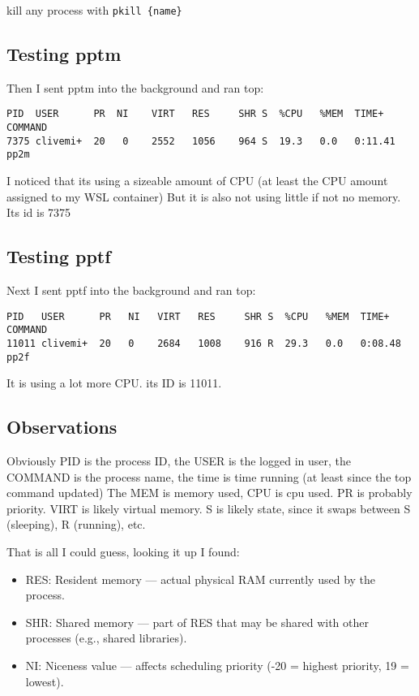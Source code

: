 \documentclass[11pt]{article}
\begin{document}
kill any process with \texttt{pkill \{name\}}

\subsection*{Testing pptm}
Then I sent pptm into the background and ran top:
\begin{lstlisting}[style=bash]
PID  USER      PR  NI    VIRT   RES     SHR S  %CPU   %MEM  TIME+   COMMAND  
7375 clivemi+  20   0    2552   1056    964 S  19.3   0.0   0:11.41 pp2m                  
\end{lstlisting}

I noticed that its using a sizeable amount of CPU (at least the CPU amount assigned to my WSL container)
But it is also not using little if not no memory. Its id is 7375

\subsection*{Testing pptf}
Next I sent pptf into the background and ran top:
\begin{lstlisting}[style=bash]
PID   USER      PR   NI   VIRT   RES     SHR S  %CPU   %MEM  TIME+   COMMAND                                                                                                                          
11011 clivemi+  20   0    2684   1008    916 R  29.3   0.0   0:08.48 pp2f           
\end{lstlisting}

It is using a lot more CPU. its ID is 11011.

\subsection*{Observations}
Obviously PID is the process ID, the USER is the logged in user, the COMMAND is the process name, the time is time running (at least since the top command updated)
The MEM is memory used, CPU is cpu used. PR is probably priority. VIRT is likely virtual memory. S is likely state, since it swaps between S (sleeping), R (running), etc.

That is all I could guess, looking it up I found:
\begin{itemize}
    \item RES: Resident memory --- actual physical RAM currently used by the process.
    \item SHR: Shared memory --- part of RES that may be shared with other processes (e.g., shared libraries).
    \item NI: Niceness value --- affects scheduling priority (-20 = highest priority, 19 = lowest).
\end{itemize}
\end{document}
